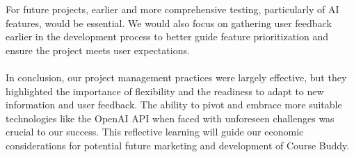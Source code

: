 \documentclass{article}
\begin{document}
For future projects, earlier and more comprehensive testing, particularly of AI features, would be essential. We would also focus on gathering user feedback earlier in the development process to better guide feature prioritization and ensure the project meets user expectations.
\\\\
In conclusion, our project management practices were largely effective, but they highlighted the importance of flexibility and the readiness to adapt to new information and user feedback. The ability to pivot and embrace more suitable technologies like the OpenAI API when faced with unforeseen challenges was crucial to our success. This reflective learning will guide our economic considerations for potential future marketing and development of Course Buddy.
\end{document}
